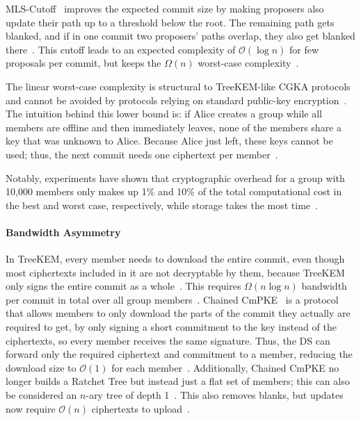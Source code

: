 \documentclass[conference]{IEEEtran}
\begin{document}
MLS-Cutoff~\cite{auerbachContinuousGroupKeyAgreement2025} improves the expected commit size by making proposers also update their path up to a threshold below the root.
The remaining path gets blanked, and if in one commit two proposers' paths overlap, they also get blanked there~\cite{auerbachContinuousGroupKeyAgreement2025}.
This cutoff leads to an expected complexity of $\mathcal{O}(\log n)$ for few proposals per commit, but keeps the $\Omega(n)$ worst-case complexity~\cite{auerbachContinuousGroupKeyAgreement2025}.

The linear worst-case complexity is structural to TreeKEM-like \ac{CGKA} protocols and cannot be avoided by protocols relying on standard public-key encryption~\cite{auerbachContinuousGroupKeyAgreement2025,bartusekFairWeatherNoMore2026}.
The intuition behind this lower bound is: if Alice creates a group while all members are offline and then immediately leaves, none of the members share a key that was unknown to Alice.
Because Alice just left, these keys cannot be used; thus, the next commit needs one ciphertext per member~\cite{bartusekFairWeatherNoMore2026}.

Notably, experiments have shown that cryptographic overhead for a group with 10,000 members only makes up 1\% and 10\% of the total computational cost in the best and worst case, respectively, while storage takes the most time~\cite{solerAnalysisEfficiencyMessaging2025}.

\paragraph{Bandwidth Asymmetry}
In TreeKEM, every member needs to download the entire commit, even though most ciphertexts included in it are not decryptable by them, because TreeKEM only signs the entire commit as a whole~\cite{hashimotoConcreteTreatmentEfficient2021}.
This requires $\Omega(n \log n)$ bandwidth per commit in total over all group members~\cite{hashimotoConcreteTreatmentEfficient2021}.
Chained CmPKE~\cite{hashimotoConcreteTreatmentEfficient2021} is a protocol that allows members to only download the parts of the commit they actually are required to get, by only signing a short commitment to the key instead of the ciphertexts, so every member receives the same signature.
Thus, the \ac{DS} can forward only the required ciphertext and commitment to a member, reducing the download size to $\mathcal{O}(1)$ for each member~\cite{hashimotoConcreteTreatmentEfficient2021}.
Additionally, Chained CmPKE no longer builds a Ratchet Tree but instead just a flat set of members; this can also be considered an $n$-ary tree of depth 1~\cite{hashimotoConcreteTreatmentEfficient2021}.
This also removes blanks, but updates now require $\mathcal{O}(n)$ ciphertexts to upload~\cite{hashimotoConcreteTreatmentEfficient2021}.
\end{document}
